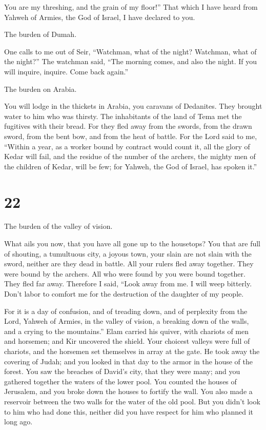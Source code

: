  You are my threshing, and the grain of my floor!'' That
which I have heard from Yahweh of Armies, the God of Israel, I have
declared to you.

 The burden of Dumah.

One calls to me out of Seir, ``Watchman, what of the night? Watchman,
what of the night?''  The watchman said, ``The morning
comes, and also the night. If you will inquire, inquire. Come back
again.''

 The burden on Arabia.

You will lodge in the thickets in Arabia, you caravans of Dedanites.
 They brought water to him who was thirsty. The inhabitants
of the land of Tema met the fugitives with their bread. 
For they fled away from the swords, from the drawn sword, from the bent
bow, and from the heat of battle.  For the Lord said to me,
``Within a year, as a worker bound by contract would count it, all the
glory of Kedar will fail,  and the residue of the number of
the archers, the mighty men of the children of Kedar, will be few; for
Yahweh, the God of Israel, has spoken it.''

\hypertarget{section-21}{%
\section{22}\label{section-21}}

 The burden of the valley of vision.

What ails you now, that you have all gone up to the housetops?
 You that are full of shouting, a tumultuous city, a joyous
town, your slain are not slain with the sword, neither are they dead in
battle.  All your rulers fled away together. They were bound
by the archers. All who were found by you were bound together. They fled
far away.  Therefore I said, ``Look away from me. I will
weep bitterly. Don't labor to comfort me for the destruction of the
daughter of my people.

 For it is a day of confusion, and of treading down, and of
perplexity from the Lord, Yahweh of Armies, in the valley of vision, a
breaking down of the walls, and a crying to the mountains.''
 Elam carried his quiver, with chariots of men and horsemen;
and Kir uncovered the shield.  Your choicest valleys were
full of chariots, and the horsemen set themselves in array at the gate.
 He took away the covering of Judah; and you looked in that
day to the armor in the house of the forest.  You saw the
breaches of David's city, that they were many; and you gathered together
the waters of the lower pool.  You counted the houses of
Jerusalem, and you broke down the houses to fortify the wall.
 You also made a reservoir between the two walls for the
water of the old pool. But you didn't look to him who had done this,
neither did you have respect for him who planned it long ago.

